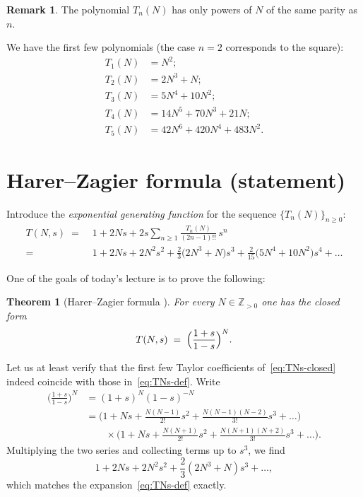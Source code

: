 \documentclass[letterpaper,11pt,oneside,reqno]{article}
\numberwithin{equation}{section}
\newtheorem{theorem}[proposition]{Theorem}
\theoremstyle{definition}
\newtheorem{remark}[proposition]{Remark}
\begin{document}
\begin{remark}
The polynomial $T_n(N)$ has only powers of $N$ of the same parity as $n$.
\end{remark}

We have the first few polynomials
(the case $n=2$ corresponds to the square):
\begin{align*}
	T_1(N)&=N^2;\\
	T_2(N)&=2N^3+N;\\
	T_3(N)&=5N^4+10N^2;\\
	T_4(N)&=14N^5+70N^3+21N;\\
	T_5(N)&=42N^6+420N^4+483N^2.
\end{align*}

\section{Harer–Zagier formula (statement)}


Introduce the \emph{exponential generating function}
for the sequence $\{T_n(N)\}_{n\ge 0}$:
\begin{equation}\label{eq:TNs-def} %
  \begin{split}
    T(N,s)\;=&\;1+2Ns
            +2s\sum_{n\ge 1}\frac{T_n(N)}{(2n-1)!!}\,s^{n}
        \\
       =&\;
        1+2Ns+2N^{2}s^{2}
        +\frac{2}{3}\bigl(2N^{3}+N\bigr)s^{3}
        +\frac{2}{15}\bigl(5N^{4}+10N^{2}\bigr)s^{4}
        +\dots
  \end{split}
\end{equation}

One of the goals of today's lecture is to prove the following:
\begin{theorem}
	[Harer–Zagier formula \cite{harer1986euler}]
	\label{thm:HZ-genfun}
	For every $N\in\mathbb{Z}_{>0}$ one has the closed form
\begin{equation}\label{eq:TNs-closed}
  T(N,s)\;=\;\Bigl(\frac{1+s}{1-s}\Bigr)^{N}.
\end{equation}
\end{theorem}


Let us at least
verify that
the first few Taylor coefficients of~\eqref{eq:TNs-closed}
indeed coincide with those in~\eqref{eq:TNs-def}.
Write
\begin{align*}
  \Biggl(\frac{1+s}{1-s}\Biggr)^N
  &= (1+s)^N (1-s)^{-N} \\
  &=
  \Biggl(1 + Ns + \frac{N(N-1)}{2!}s^2 + \frac{N(N-1)(N-2)}{3!}s^3 + \dots\Biggr) \\
  &\qquad\times
  \Biggl(1 + Ns + \frac{N(N+1)}{2!}s^2 + \frac{N(N+1)(N+2)}{3!}s^3 + \dots\Biggr).
\end{align*}
Multiplying the two series and collecting terms up to $s^3$, we find
\[
  1 + 2N s + 2N^2 s^2 + \frac{2}{3}(2N^3 + N) s^3 + \dots,
\]
which matches the expansion~\eqref{eq:TNs-def} exactly.
\end{document}
